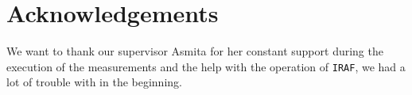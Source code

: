 \documentclass[abstracton,11pt,twoside]{scrreprt} %
\begin{document}
	


\tableofcontents
\blankpage
	




\newpage








%

\newpage	
\listoffigures
\newpage
\thispagestyle{plain}
\nocite{*}
\printbibliography[title=References]
\vfill
\section*{Acknowledgements}
We want to thank our supervisor Asmita for her constant support during the execution of the measurements and the help with the operation of \texttt{IRAF}, we had a lot of trouble with in the beginning.
\vfill
\end{document}
